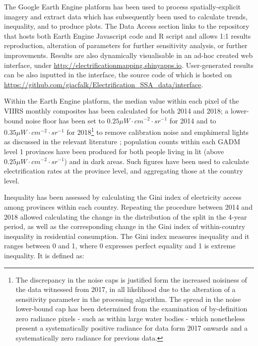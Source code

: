 \documentclass[preprint,12pt]{elsarticle}
\begin{document}
The Google Earth Engine platform \citep{gorelick2017google} has been used to process spatially-explicit imagery and extract data which has subsequently been used to calculate trends, inequality, and to produce plots. The Data Access section links to the repository that hosts both Earth Engine Javascript code and R script and allows 1:1 results reproduction, alteration of parameters for further sensitivity analysis, or further improvements. Results are also dynamically visualisable in an ad-hoc created web interface, under \url{http://electrificationmapping.shinyapps.io}. User-generated results can be also inputted in the interface, the source code of which is hosted on \url{https://github.com/giacfalk/Electrification_SSA_data/interface}.

Within the Earth Engine platform, the median value within each pixel of the VIIRS monthly composites has been calculated for both 2014 and 2018; a lower-bound noise floor has been set to $0.25 \mu W \cdot cm^{-2} \cdot sr^{-1}$ for 2014 and to $0.35 \mu W \cdot cm^{-2} \cdot sr^{-1}$ for 2018\footnote{The discrepancy in the noise caps is justified form the increased noisiness of the data witnessed from 2017, in all likelihood due to the alteration of a sensitivity parameter in the processing algorithm. The spread in the noise lower-bound cap has been determined from the examination of by-definition zero radiance pixels - such as within large water bodies - which nonetheless present a systematically positive radiance for data form 2017 onwards and a systematically zero radiance for previous data.} to remove calibration noise and emphimeral lights as discussed in the relevant literature \citep{roman_holidays_2015, levin_global_2017}; population counts within each GADM level 1 provinces have been produced for both people living in lit (above $0.25 \mu W \cdot cm^{-2} \cdot sr^{-1}$)  and in dark areas. Such figures have been used to calculate electrification rates at the province level, and aggregating those at the country level. 

Inequality has been assessed by calculating the Gini index of electricity access among provinces within each country. Repeating the procedure between 2014 and 2018 allowed calculating the change in the distribution of the split in the 4-year period, as well as the corresponding change in the Gini index of within-country inequality in residential consumption. The Gini index measures inequality and it ranges between 0 and 1, where 0 expresses perfect equality and 1 is extreme inequality. It is defined as:
\end{document}

